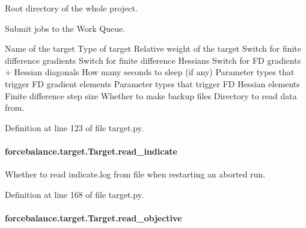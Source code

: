 Root directory of the whole project. 

Submit jobs to the Work Queue.

Name of the target Type of target Relative weight of the target Switch for finite difference gradients Switch for finite difference Hessians Switch for F\-D gradients + Hessian diagonals How many seconds to sleep (if any) Parameter types that trigger F\-D gradient elements Parameter types that trigger F\-D Hessian elements Finite difference step size Whether to make backup files Directory to read data from.

Definition at line 123 of file target.\-py.

\hypertarget{classforcebalance_1_1target_1_1Target_aa8af57d5be669c4bb1c0cfd4b7a9220e}{
\paragraph[{read\-\_\-indicate}]{\setlength{\rightskip}{0pt plus 5cm}forcebalance.\-target.\-Target.\-read\-\_\-indicate\hspace{0.3cm}{\ttfamily [inherited]}}}\label{classforcebalance_1_1target_1_1Target_aa8af57d5be669c4bb1c0cfd4b7a9220e}


Whether to read indicate.\-log from file when restarting an aborted run. 



Definition at line 168 of file target.\-py.

\hypertarget{classforcebalance_1_1target_1_1Target_a22bdc4bbce2020ae44b44ad3e444fda6}{
\paragraph[{read\-\_\-objective}]{\setlength{\rightskip}{0pt plus 5cm}forcebalance.\-target.\-Target.\-read\-\_\-objective\hspace{0.3cm}{\ttfamily [inherited]}}}\label{classforcebalance_1_1target_1_1Target_a22bdc4bbce2020ae44b44ad3e444fda6}


